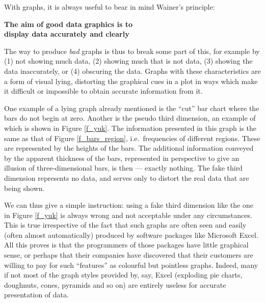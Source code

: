With graphs, it is always useful to bear in mind Wainer's
principle:
\begin{center}
\textbf{The aim of good data graphics is to}\\
\textbf{display data accurately and clearly}
\end{center}
The way to produce \emph{bad} graphs is thus to break some part of this,
for example by (1) not showing much data, (2) showing much that is not
data, (3) showing the data inaccurately, or (4) obscuring the data.
Graphs with these characteristics are a form of visual lying,
distorting the graphical cues in a plot in ways which make it difficult or
impossible to obtain accurate information from it.

One example of a lying graph already mentioned is the ``cut'' bar chart
where the bars do not begin at zero. Another is the pseudo third
dimension, an example of which is shown in Figure \ref{f_yuk}. The
information presented in this graph is the same as that of Figure
\ref{f_bars_region}, i.e.\ frequencies of different regions. These are
represented by the heights of the bars. The additional information
conveyed by the apparent thickness of the bars, represented in
perspective to give an illusion of three-dimensional bars, is then ---
exactly nothing. The fake third dimension represents no data, and serves
only to distort the real data that are being shown.

We can thus give a simple instruction: using a fake third dimension like
the one in Figure \ref{f_yuk} is always wrong and not acceptable under
any circumstances. This is true irrespective of the fact that such
graphs are often seen and easily (often almost automatically) produced
by software packages like Microsoft Excel. All this proves is that the
programmers of those packages have little graphical sense, or perhaps
that their companies have discovered that their customers are willing to
pay for such ``features'' as colourful but pointless graphs. Indeed, many
if not most of the graph styles provided by, say, Excel (exploding pie
charts, doughnuts, cones, pyramids and so on) are entirely useless for
accurate presentation of data.

